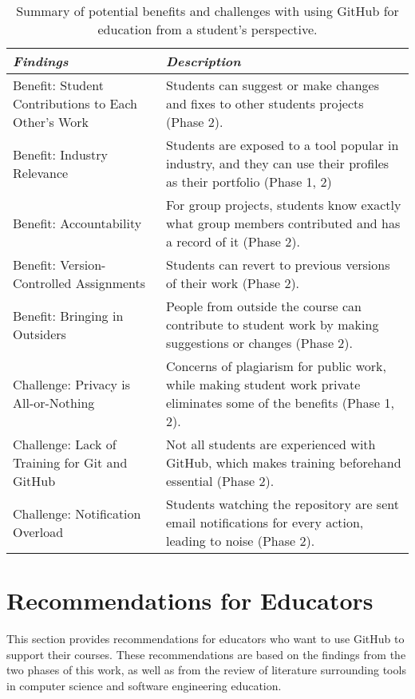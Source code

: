 \begin{table}[htp]
    \vspace{1pt}
        \caption{Summary of potential benefits and challenges with using GitHub for education from a student's perspective.}\label{table:findings:students}
    \vspace{1pt}
    \begin{center}
        \begin{tabular}{ | m{3cm} | m{12cm} | }
            \hline
            \emph{Findings} & \emph{Description} \\
            \hline
            Benefit: Student Contributions to Each Other’s Work & Students can suggest or make changes and fixes to other students projects (Phase 2)​. \\
            \hline
            Benefit: Industry Relevance & Students are exposed to a tool popular in industry, and they can use their profiles as their portfolio (Phase 1, 2)​ \\
            \hline
            Benefit: Accountability & For group projects, students know exactly what group members contributed and has a record of it (Phase 2). \\
            \hline
            Benefit: Version-Controlled Assignments & Students can revert to previous versions of their work (Phase 2). \\
            \hline
            Benefit: Bringing in Outsiders & People from outside the course can contribute to student work by making suggestions or changes (Phase 2)​. \\
            \hline
            Challenge: Privacy is All-or-Nothing & Concerns of plagiarism for public work, while making student work private eliminates some of the benefits (Phase 1, 2)​. \\
            \hline
            Challenge: Lack of Training for Git and GitHub & Not all students are experienced with GitHub, which makes training beforehand essential (Phase 2)​. \\
            \hline
            Challenge: Notification Overload & Students watching the repository are sent email notifications for every action, leading to noise (Phase 2).​ \\
            \hline
        \end{tabular}
    \end{center}
\end{table}

\section{Recommendations for Educators}
This section provides recommendations for educators who want to use GitHub to support their courses. These recommendations are based on the findings from the two phases of this work, as well as from the review of literature surrounding tools in computer science and software engineering education.

